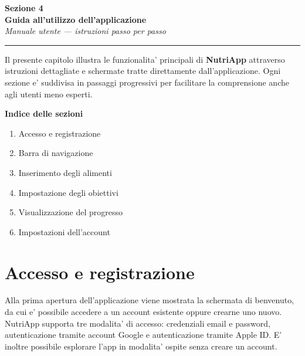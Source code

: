 \documentclass[a4paper,12pt]{article}
\newcounter{passo}[subsection]
\begin{document}
\begin{center}
  {\Huge\bfseries\color{nutrigreen} Sezione 4}\\[6pt]
  {\Large\bfseries\color{nutridark} Guida all'utilizzo dell'applicazione}\\[4pt]
  {\normalsize\itshape\color{nutrigray} Manuale utente --- istruzioni passo per passo}
\end{center}

\medskip
\noindent\rule{\textwidth}{1.5pt}{\color{nutrigreen}}
\medskip

\noindent Il presente capitolo illustra le funzionalita' principali di \textbf{NutriApp}
attraverso istruzioni dettagliate e schermate tratte direttamente dall'applicazione.
Ogni sezione e' suddivisa in passaggi progressivi per facilitare la comprensione anche
agli utenti meno esperti.

\medskip
\begin{infobox}
  \textbf{\color{nutrigreen}Indice delle sezioni}
  \begin{enumerate}[leftmargin=1.4em, itemsep=2pt]
    \item Accesso e registrazione
    \item Barra di navigazione
    \item Inserimento degli alimenti
    \item Impostazione degli obiettivi
    \item Visualizzazione del progresso
    \item Impostazioni dell'account
  \end{enumerate}
\end{infobox}

\newpage

\section{Accesso e registrazione}

Alla prima apertura dell'applicazione viene mostrata la schermata di benvenuto,
da cui e' possibile accedere a un account esistente oppure crearne uno nuovo.
NutriApp supporta tre modalita' di accesso: credenziali email e password,
autenticazione tramite account Google e autenticazione tramite Apple ID.
E' inoltre possibile esplorare l'app in modalita' ospite senza creare un account.
\end{document}
